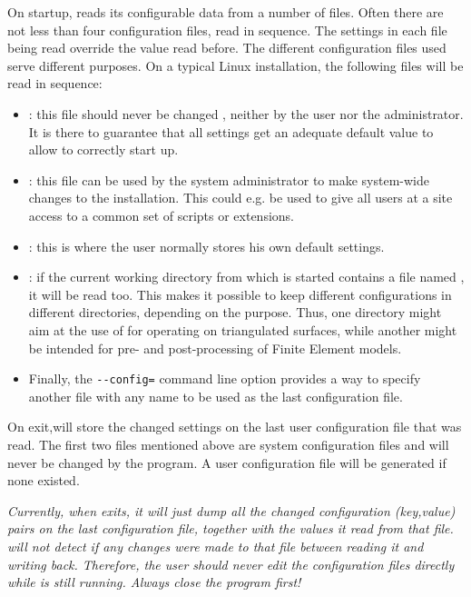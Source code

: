 On startup, \pyf reads its configurable data from a number of files. Often there are not less than four configuration files, read in sequence. The settings in each file being read override the value read before. The different configuration files used serve different purposes. On a typical Linux installation, the following files will be read in sequence:
\begin{itemize}
\item {}: this file should never be changed , neither by the user nor the administrator. It is there to guarantee that all settings get an adequate default value to allow \pyf to correctly start up.
\item {}: this file can be used by the system administrator to make system-wide changes to the \pyf installation. This could e.g. be used to give all users at a site access to a common set of scripts or extensions.
\item {}: this is where the user normally stores his own default settings.
\item {}: if the current working directory from which \pyf is started contains a file named , it will be read too. This makes it possible to keep different configurations in different directories, depending on the purpose. Thus, one directory might aim at the use of \pyf for operating on triangulated surfaces, while another might be intended for pre- and post-processing of Finite Element models.
\item Finally, the \verb|--config=| command line option provides a way to specify another file with any name to be used as the last configuration file.
\end{itemize}

On exit,\pyf will store the changed settings on the last user configuration file that was read. The first two files mentioned above are system configuration files and will never be changed by the \pyf program. A user configuration file will be generated if none existed.

\emph{Currently, when \pyf exits, it will just dump all the changed configuration (key,value) pairs on the last configuration file, together with the values it read from that file. \pyf will not detect if any changes were made to that file between reading it and writing back. Therefore, the user should never edit the configuration files directly while \pyf is still running. Always close the program first!}


